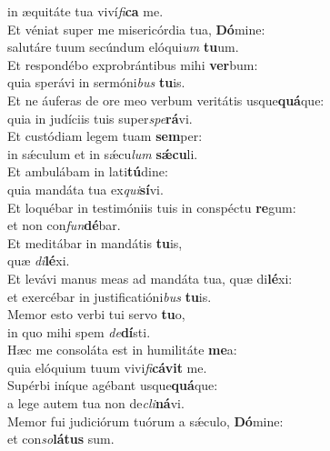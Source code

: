 \evenverse in æquitáte tua viví\textit{fi}\textbf{ca} me.\\
\oddverse Et véniat super me misericórdia tua, \textbf{Dó}mine:~\*\\
\oddverse salutáre tuum secúndum elóqui\textit{um} \textbf{tu}um.\\
\evenverse Et respondébo exprobrántibus mihi \textbf{ver}bum:~\*\\
\evenverse quia sperávi in sermóni\textit{bus} \textbf{tu}is.\\
\oddverse Et ne áuferas de ore meo verbum veritátis usque\textbf{quá}que:~\*\\
\oddverse quia in judíciis tuis super\textit{spe}\textbf{rá}vi.\\
\evenverse Et custódiam legem tuam \textbf{sem}per:~\*\\
\evenverse in sǽculum et in sǽcu\textit{lum} \textbf{sǽ}\textbf{cu}li.\\
\oddverse Et ambulábam in lati\textbf{tú}dine:~\*\\
\oddverse quia mandáta tua ex\textit{qui}\textbf{sí}vi.\\
\evenverse Et loquébar in testimóniis tuis in conspéctu \textbf{re}gum:~\*\\
\evenverse et non con\textit{fun}\textbf{dé}bar.\\
\oddverse Et meditábar in mandátis \textbf{tu}is,~\*\\
\oddverse quæ \textit{di}\textbf{lé}xi.\\
\evenverse Et levávi manus meas ad mandáta tua, quæ di\textbf{lé}xi:~\*\\
\evenverse et exercébar in justificatióni\textit{bus} \textbf{tu}is.\\
\oddverse Memor esto verbi tui servo \textbf{tu}o,~\*\\
\oddverse in quo mihi spem \textit{de}\textbf{dí}sti.\\
\evenverse Hæc me consoláta est in humilitáte \textbf{me}a:~\*\\
\evenverse quia elóquium tuum vivi\textit{fi}\textbf{cá}\textbf{vit} me.\\
\oddverse Supérbi iníque agébant usque\textbf{quá}que:~\*\\
\oddverse a lege autem tua non de\textit{cli}\textbf{ná}vi.\\
\evenverse Memor fui judiciórum tuórum a sǽculo, \textbf{Dó}mine:~\*\\
\evenverse et con\textit{so}\textbf{lá}\textbf{tus} sum.\\
